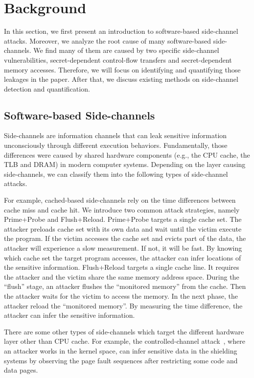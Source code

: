 \section{Background}
In this section, we first present an introduction to software-based 
side-channel attacks. Moreover, we analyze the root cause of many
software-based side-channels. We find many of them are caused by
two specific side-channel vulnerabilities, secret-dependent control-flow transfers and
secret-dependent memory accesses. Therefore, we will focus on identifying
and quantifying those leakages in the paper. After that, we 
discuss existing methods on side-channel detection and quantification.

\subsection{Software-based Side-channels}
Side-channels are information channels that can leak sensitive information 
unconsciously through different execution behaviors.  Fundamentally, those 
differences were caused by shared hardware
components (e.g., the CPU cache, the TLB and DRAM) in modern computer systems.
Depending on the layer causing side-channels, we can classify them 
into the following types of side-channel attacks.

For example, cached-based side-channels rely on the time differences 
between cache miss and cache hit. We introduce two common attack strategies,
namely Prime+Probe and Flush+Reload.
Prime+Probe targets a single cache set. The attacker preloads cache set with
its own data and wait until the victim execute the program.
If the victim accesses the cache set and evicts part of 
the data, the attacker will experience a slow measurement. If not, 
it will be fast. By knowing which cache set the target
program accesses, the attacker can infer locations of
the sensitive information. Flush+Reload targets a single cache line. 
It requires the attacker and the victim share the same memory address space.
During the ``flush'' stage, an attacker 
flushes the ``monitored memory'' from the cache. Then the attacker
waits for the victim to access the memory. In the next phase, the 
attacker reload the ``monitored memory''. By measuring the time difference, the
attacker can infer the sensitive information.

There are some other types of side-channels which target the different hardware layer other than  
CPU cache.
For example, the controlled-channel attack~\cite{7163052},
where an attacker works in the kernel space, can infer sensitive data in the shielding systems by
observing the page fault sequences after restricting some code and
data pages. 

